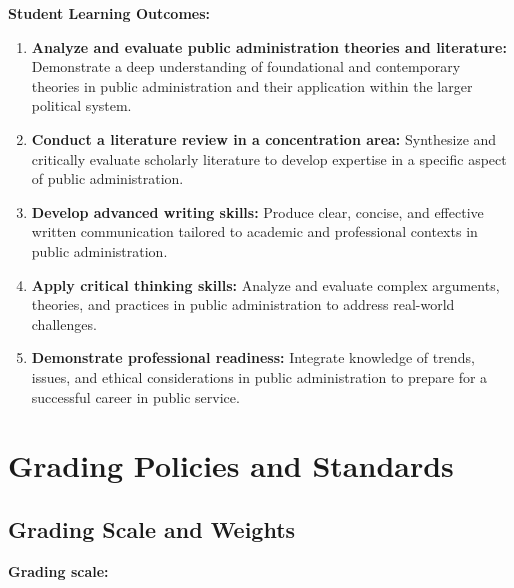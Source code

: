 \documentclass[12pt]{article}     %
\begin{document}
\vspace{1em}
\noindent \textbf{Student Learning Outcomes:}
                   \begin{enumerate}
                        \item \textbf{Analyze and evaluate public administration theories and literature:} Demonstrate a deep understanding of foundational and contemporary theories in public administration and their application within the larger political system.
                        \item \textbf{Conduct a literature review in a concentration area:} Synthesize and critically evaluate scholarly literature to develop expertise in a specific aspect of public administration.
                        \item \textbf{Develop advanced writing skills:} Produce clear, concise, and effective written communication tailored to academic and professional contexts in public administration.
                        \item \textbf{Apply critical thinking skills:} Analyze and evaluate complex arguments, theories, and practices in public administration to address real-world challenges.
                        \item \textbf{Demonstrate professional readiness:} Integrate knowledge of trends, issues, and ethical considerations in public administration to prepare for a successful career in public service.
                  \end{enumerate}

\section{Grading Policies and Standards}

\subsection*{Grading Scale and Weights}

\noindent \textbf{Grading scale:}
\end{document}
